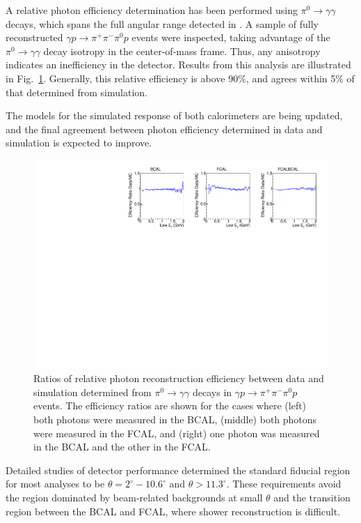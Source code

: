 A relative photon efficiency determination has been performed using $\pi^0\to\gamma\gamma$ decays, which spans the full angular range detected in \gx{}.  A sample of fully reconstructed $\gamma p \to  \pi^+\pi^-\pi^0 p$ events were inspected, taking advantage of the $\pi^0\to\gamma\gamma$ decay isotropy in the center-of-mass frame.  Thus, any anisotropy indicates an inefficiency in the detector. Results from this analysis are illustrated in Fig.~\ref{fig:bcalpi0photoneff}. Generally, this relative efficiency is above 90\%, and agrees within 5\% of that determined from simulation.  

The models for the simulated response of both calorimeters are being updated, and the final agreement between photon efficiency determined in data and simulation is expected to improve.

\begin{figure}[tbp]
\begin{center}
\includegraphics[width=\textwidth]{figures/plot_CostheEff_NIM_jun19.pdf}
\caption{\label{fig:bcalpi0photoneff}
Ratios of relative photon reconstruction efficiency between data and simulation determined from $\pi^0\to\gamma \gamma$ decays in $\gamma p \to  \pi^+\pi^-\pi^0 p$ events.  The efficiency ratios are shown for the cases where (left) both photons were measured in the BCAL, (middle) both photons were measured in the FCAL, and (right) one photon was measured in the BCAL and the other in the FCAL.
}
\end{center}
\end{figure}


Detailed studies of detector performance determined the standard fiducial region for most analyses to be $\theta = 2^\circ - 10.6^\circ$ and $\theta > 11.3^\circ$.  These requirements avoid the region dominated by beam-related backgrounds at small $\theta$ and the transition region between the BCAL and FCAL, where shower reconstruction is difficult.

